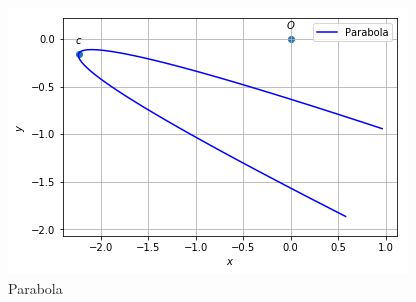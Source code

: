 \documentclass[journal,12pt,twocolumn]{IEEEtran}
\begin{document}
\clearpage
\begin{figure}[!htbp]
	\centering
	\includegraphics[width =\columnwidth]{parabola.png}
	\caption{Parabola }
	\label{fig:1}
\end{figure}	
\end{document}
